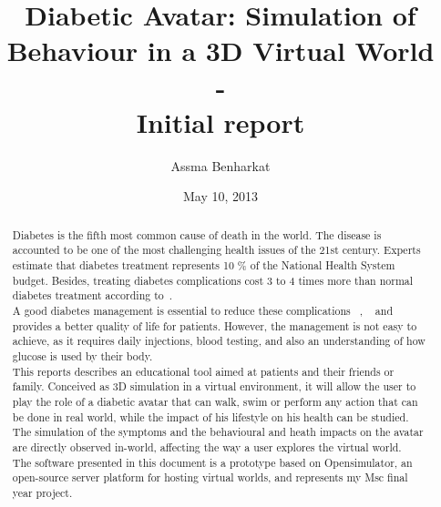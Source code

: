\documentclass[12pt,MSc]{muthesis}
\title{Diabetic Avatar: Simulation of Behaviour in a 3D Virtual World \\-\\ Initial report}
\author{Assma Benharkat}
\date{May 10,  2013}
\newcommand{\warn}[1]{\ifdefined\debug\textcolor{blue}{#1}\else#1\fi}
\begin{document}
%



\maketitle
   \begin{abstract}

Diabetes is the fifth most common cause of death in the world. The disease is accounted to be one of the most challenging health issues of the 21st century.  
Experts estimate that diabetes treatment represents 10 \% of the National Health System budget. Besides, 
treating diabetes complications cost 3 to 4 times more than normal diabetes treatment according to~\cite{LondonKanavos2012}. %
\\A good diabetes management is essential to reduce these complications ~\cite{complications1993QuasiCours}, ~\cite{nathan2005intensive}
and provides a better quality of life for patients. However, the management is not easy to achieve, as it requires daily injections, blood testing, and also an understanding of how glucose is used by their body.  
\\This reports describes an educational tool aimed at patients and their friends or family. Conceived as 3D simulation in a virtual environment, it will allow the user to play the role of a diabetic avatar that can walk, swim or perform any action that can be done in real world, while the impact of his lifestyle on his health can be studied. The simulation of the symptoms and the behavioural and heath impacts on the avatar are directly observed in-world, affecting the way a user explores the virtual world. 
\\The software presented in this document is a prototype based on Opensimulator, an open-source server platform for hosting virtual worlds, and represents my Msc final year project.


\end{abstract}
\end{document}

